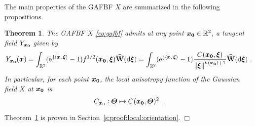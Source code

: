 \documentclass{elsarticle}
\newtheorem{theorem}{Theorem}
\newenvironment{proof}{\medskip\noindent{\bf Proof.}\;}{\null\hfill $\Box$\par\medskip }
\begin{document}
The main properties of the GAFBF $X$ are summarized in the following propositions.
%
\begin{theorem}\label{theo:local:orientation:genCFBA}
The GAFBF $X$ \eqref{eq:gafbf} admits at any point $\bm{x_0}\in \mathbb{R}^2$, a tangent field $Y_{\bm{x_0}}$  given by
\begin{equation}\label{eq:Yx0}
Y_{\bm{x_0}}(\bm{x})=\int_{\mathbb{R}^2}(\mathrm{e}^{\, \mathrm{j} \left \langle \bm{x},\, \bm{\xi}\right \rangle}-1)f^{1/2}(\bm{x_0},\bm{\xi})\widehat{\mathbf{W}}(\mathop{}\mathopen{}\mathrm{d} \bm{\xi})=\int_{\mathbb{R}^2}(\mathrm{e}^{\, \mathrm{j} \left \langle \bm{x},\, \bm{\xi}\right \rangle}-1)\frac{C(\bm{x_0},\bm{\xi})}{\left\lVert\bm{\xi}\right\rVert^{h(\bm{x_0})+1}}\widehat{\mathbf{W}}(\mathop{}\mathopen{}\mathrm{d} \bm{\xi})\;.\end{equation}
In particular, for each point $\bm{x_0}$, the local anisotropy function of the Gaussian field $X$ at $\bm{x_0}$ is 
\[
C_{\bm{x}_0}:\bm{\Theta}\mapsto C(\bm{x_0},\bm{\Theta})^2\;.
\]
\end{theorem}
%
\begin{proof}
Theorem~\ref{theo:local:orientation:genCFBA} is proven in Section~\ref{s:proof:local:orientation}.
\end{proof}
\end{document}

